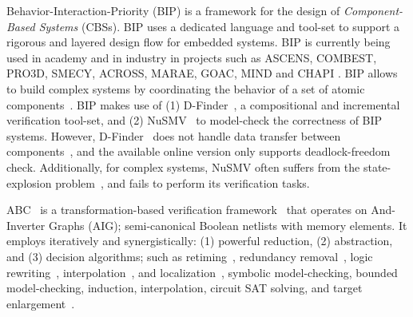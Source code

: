 %
Behavior-Interaction-Priority (BIP) is a framework for the design of 
{\em Component-Based Systems} (CBSs). 
BIP uses a dedicated language and tool-set to support a rigorous 
and layered design flow for embedded systems. 
BIP is currently being used in academy and in industry in projects such as 
ASCENS, COMBEST, PRO3D, SMECY, ACROSS, MARAE, GOAC, MIND and CHAPI \cite{bipwebsite}. 
BIP allows to build complex systems by coordinating the behavior of a set of 
atomic components~\cite{bip11}.
BIP makes use of (1) D-Finder~\cite{dfinder}, a compositional  
and incremental verification tool-set, and (2) NuSMV~\cite{nusmv}
to model-check the correctness of BIP systems. 
However, D-Finder~\cite{BBL14} does not handle data transfer between components~\cite{QiangB15}, 
and the available online version only supports deadlock-freedom check.
Additionally, for complex systems, NuSMV often suffers from the state-explosion problem~\cite{sipser2006introduction}, and fails to perform its verification tasks.

ABC~\cite{brayton2010abc} is a transformation-based 
verification framework~\cite{KuBa01} that operates on 
And-Inverter Graphs (AIG); semi-canonical Boolean netlists with
memory elements. It employs iteratively and synergistically: (1) powerful reduction, (2) abstraction, and (3) decision algorithms; such as
retiming~\cite{KuBa01}, 
redundancy removal~\cite{HmBPK05,KuMP01,BjesseC00,aziz-fmsd-00}, 
logic rewriting~\cite{BjBo04}, interpolation~\cite{McMillan03}, 
and localization~\cite{Wang03}, 
symbolic model-checking, bounded model-checking, induction, 
interpolation, circuit SAT solving, 
and target enlargement~\cite{MoGS00,MoMZ01,HoSH00,BaKuAb02,Hari05expert}.

